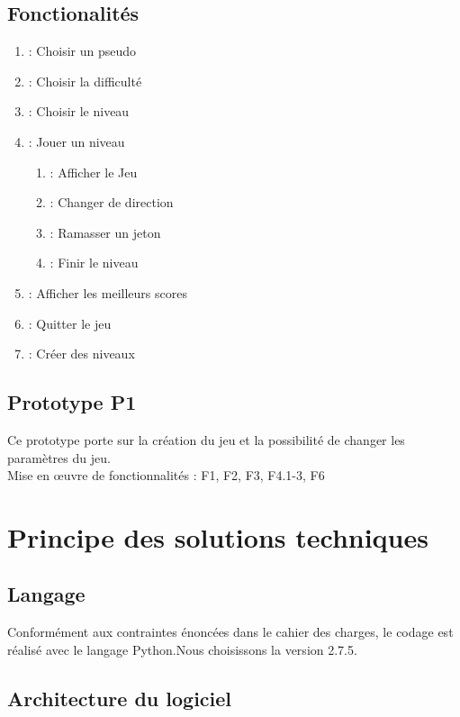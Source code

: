 \documentclass[a4paper,11pt]{scrartcl}
\begin{document}
\subsection{Fonctionalités}

\begin{enumerate}[label*= F\arabic*,font = \textbf]
	\item : Choisir un pseudo
	\item : Choisir la difficulté
	\item : Choisir le niveau
	\item : Jouer un niveau
	\begin{enumerate}[label*=.\arabic*,font = \textbf]
		\item : Afficher le Jeu
		\item : Changer de direction
		\item : Ramasser un jeton
		\item : Finir le niveau
	\end{enumerate}
	\item : Afficher les meilleurs scores
	\item : Quitter le jeu
    \item : Créer des niveaux
\end{enumerate}

\subsection{Prototype P1}

Ce prototype porte sur la création du jeu et la possibilité de changer les paramètres du jeu.\\
Mise en œuvre de fonctionnalités : F1, F2, F3, F4.1-3, F6

\section{Principe des solutions techniques}

\subsection{Langage}

Conformément aux contraintes énoncées dans le cahier des charges, le codage est réalisé avec le langage Python.Nous choisissons la version 2.7.5.

\subsection{Architecture du logiciel}
\end{document}
